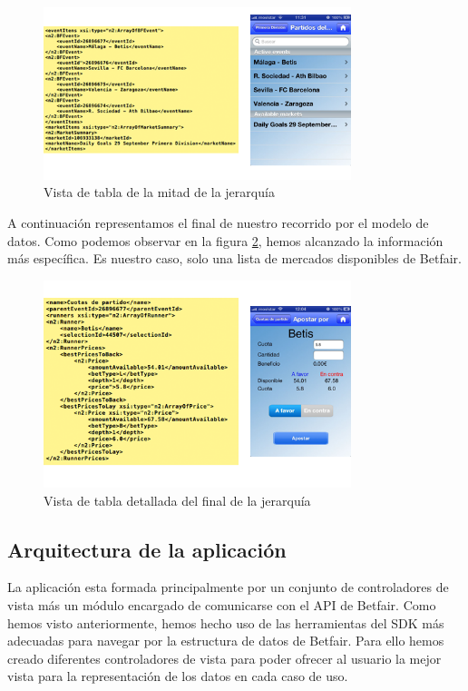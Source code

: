 \begin{figure}[ht!]
  \centering
    \includegraphics[width=0.8\textwidth]{./images/tabla_middle.png}
  \caption{Vista de tabla de la mitad de la jerarquía}
  \label{fig:table-view-middle}
\end{figure} 

 A continuación representamos el final de nuestro recorrido por el modelo de datos. Como podemos observar en la figura \ref{fig:detail-table-view}, hemos alcanzado la información más específica. Es nuestro caso, solo una lista de mercados disponibles de Betfair.

\begin{figure}[ht!]
  \centering
    \includegraphics[width=0.8\textwidth]{./images/tabla_detail.png}
  \caption{Vista de tabla detallada del final de la jerarquía }
  \label{fig:detail-table-view}
\end{figure} 

\subsection{Arquitectura de la aplicación}	
   
   La aplicación esta formada principalmente por un conjunto de controladores de vista más un módulo encargado de comunicarse con el API de Betfair. Como hemos visto anteriormente, hemos hecho uso de las herramientas del SDK más adecuadas para navegar por la estructura de datos de Betfair. Para ello hemos creado diferentes controladores de vista para poder ofrecer al usuario la mejor vista para la representación de los datos en cada caso de uso.%
   
